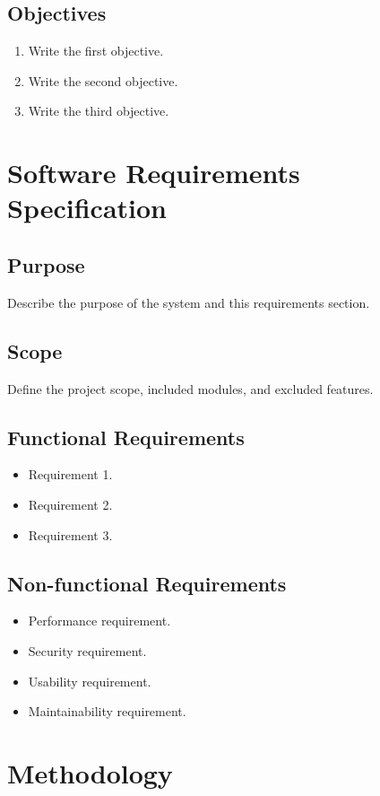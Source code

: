 \documentclass[12pt,a4paper]{report}
\begin{document}
\section{Objectives}
\begin{enumerate}
    \item Write the first objective.
    \item Write the second objective.
    \item Write the third objective.
\end{enumerate}

\chapter{Software Requirements Specification}
\section{Purpose}
Describe the purpose of the system and this requirements section.

\section{Scope}
Define the project scope, included modules, and excluded features.

\section{Functional Requirements}
\begin{itemize}
    \item Requirement 1.
    \item Requirement 2.
    \item Requirement 3.
\end{itemize}

\section{Non-functional Requirements}
\begin{itemize}
    \item Performance requirement.
    \item Security requirement.
    \item Usability requirement.
    \item Maintainability requirement.
\end{itemize}

\chapter{Methodology}
\end{document}
